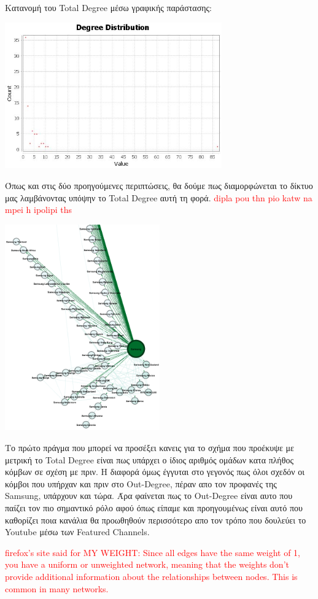 \documentclass[12pt]{article}
\begin{document}
	\newpage
	Κατανομή του Total Degree μέσω γραφικής παράστασης:
	\begin{center}
		\includegraphics[width=0.7\textwidth]{photos-files/section6/total-degree_graphical.JPG}
	\end{center}
	Όπως και στις δύο προηγούμενες περιπτώσεις, θα δούμε πως διαμορφώνεται το δίκτυο μας λαμβάνοντας υπόψην το Total Degree αυτή τη φορά. \textcolor{red}{dipla pou thn pio katw na mpei h ipolipi ths}
	\begin{center}
		\includegraphics[width=0.5\textwidth]{photos-files/section6/total-degree_RE-layout.png}
	\end{center}
	Το πρώτο πράγμα που μπορεί να προσέξει κανεις για το σχήμα που προέκυψε με μετρική το Total Degree είναι πως υπάρχει ο ίδιος αριθμός ομάδων κατα πλήθος κόμβων σε σχέση με πριν. Η διαφορά όμως έγγυται στο γεγονός πως όλοι σχεδόν οι κόμβοι που υπήρχαν και πριν στο Out-Degree, πέραν απο τον προφανές της Samsung, υπάρχουν και τώρα. Άρα φαίνεται πως το Out-Degree είναι αυτο που παίζει τον πιο σημαντικό ρόλο αφού όπως είπαμε και προηγουμένως είναι αυτό που καθορίζει ποια κανάλια θα προωθηθούν περισσότερο απο τον τρόπο που δουλεύει το Youtube μέσω των Featured Channels.
	
	\textcolor{red}{firefox's site said for MY WEIGHT: Since all edges have the same weight of 1, you have a uniform or unweighted network, meaning that the weights don't provide additional information about the relationships between nodes. This is common in many networks.}
		
	\label{chap:degree_measures_6}
	
	
\end{document}
